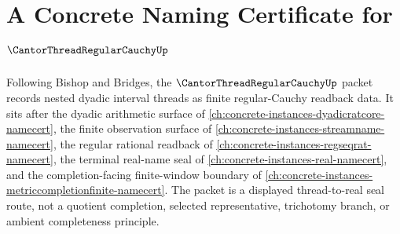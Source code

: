 \chapter{A Concrete Naming Certificate for $\CantorThreadRegularCauchyUp$}
\label{ch:concrete-instances-cantor-thread-regular-cauchy-namecert}

Following Bishop and Bridges, the $\CantorThreadRegularCauchyUp$ packet records nested dyadic interval threads as finite regular-Cauchy readback data. It sits after the dyadic arithmetic surface of \autoref{ch:concrete-instances-dyadicratcore-namecert}, the finite observation surface of \autoref{ch:concrete-instances-streamname-namecert}, the regular rational readback of \autoref{ch:concrete-instances-regseqrat-namecert}, the terminal real-name seal of \autoref{ch:concrete-instances-real-namecert}, and the completion-facing finite-window boundary of \autoref{ch:concrete-instances-metriccompletionfinite-namecert}. The packet is a displayed thread-to-real seal route, not a quotient completion, selected representative, trichotomy branch, or ambient completeness principle.

